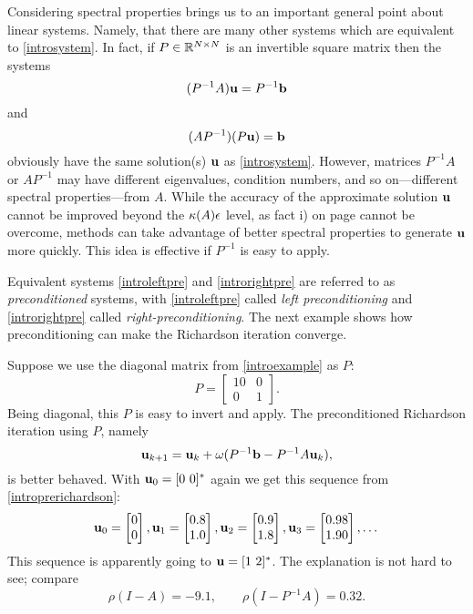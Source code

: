 Considering spectral properties brings us to an important general point about linear systems.  Namely, that there are many other systems which are equivalent to \eqref{introsystem}.  In fact, if $P\in\mathbb{R}^{N\times N}$ is an invertible square matrix then the systems
\begin{equation}
(P^{-1} A) \mathbf{u} = P^{-1} \mathbf{b} \label{introleftpre}
\end{equation}
and
\begin{equation}
(A P^{-1}) (P\mathbf{u}) = \mathbf{b} \label{introrightpre}
\end{equation}
obviously have the same solution(s) $\mathbf{u}$ as \eqref{introsystem}.  However, matrices $P^{-1} A$ or $A P^{-1}$ may have different eigenvalues, condition numbers, and so on---different spectral properties---from $A$.  While the accuracy of the approximate solution $\mathbf{u}$ cannot be improved beyond the $\kappa(A) \epsilon$ level, as fact i) on page \pageref{limittoaccuracy} cannot be overcome, methods can take advantage of better spectral properties to generate $\mathbf{u}$ more quickly.  This idea is effective if $P^{-1}$ is easy to apply.

Equivalent systems \eqref{introleftpre} and \eqref{introrightpre} are referred to as \emph{preconditioned} systems, with \eqref{introleftpre} called \emph{left preconditioning} and \eqref{introrightpre} called \emph{right-preconditioning}.  The next example shows how preconditioning can make the Richardson iteration converge.

\medskip\noindent\hrulefill
\begin{examplecont}  Suppose we use the diagonal matrix from  \eqref{introexample} as $P$:
\begin{equation}
P = \begin{bmatrix}
10 & 0 \\ 0 & 1
\end{bmatrix}.  \label{introP}
\end{equation}
Being diagonal, this $P$ is easy to invert and apply.  The preconditioned Richardson iteration using $P$, namely
\begin{equation}
\mathbf{u}_{k+1} = \mathbf{u}_k + \omega (P^{-1} \mathbf{b} - P^{-1} A \mathbf{u}_k),  \label{introprerichardson}
\end{equation}
is better behaved.  With $\mathbf{u}_0 = [0\,\, 0]^*$ again we get this sequence from \eqref{introprerichardson}:
\begin{equation}
\mathbf{u}_{0} = \begin{bmatrix} 0 \\ 0 \end{bmatrix}, \mathbf{u}_{1} = \begin{bmatrix} 0.8 \\ 1.0 \end{bmatrix}, \mathbf{u}_{2} = \begin{bmatrix} 0.9 \\ 1.8 \end{bmatrix}, \mathbf{u}_{3} = \begin{bmatrix} 0.98 \\ 1.90 \end{bmatrix}, \dots
\end{equation}
This sequence is apparently going to $\mathbf{u} = [1\,\, 2]^*$.  The explanation is not hard to see; compare
\begin{equation}
\rho(I-A) = -9.1, \qquad \rho(I-P^{-1} A) = 0.32.
\end{equation}
\end{examplecont}
\noindent\hrulefill

